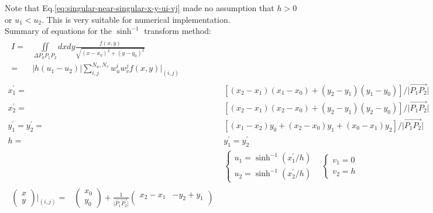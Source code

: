 \documentclass [10pt,letterpaper]{article}
\begin{document}
Note that Eq.\eqref{eq:singular-near-singular-x-y-ui-vj} made no assumption
that $h>0$ or $u_1<u_2$.
This is very suitable for numerical implementation.
\\
Summary of equations for the $\sinh^{-1}$ transform method:
\begin{subequations} \label{eq:singular-near-singular-summary-of-arsh-equations}
	\begin{align}
		\begin{split} 
			I
			=&
				\iint \limits_{\Delta P_0 P_1 P_2}
				dx dy
				\frac{ f(x,y) } { \sqrt{ (x-x_0)^2 + (y-y_0)^2 } }
			\\
			=&
				\lvert
					h
					(u_1-u_2)
				\rvert
				\sum \nolimits_{i,j}^{N_u,N_v} 
				w_u^i w_v^j
				f(x,y)
				\big\vert
				_{ (i,j) }
		\end{split}
		\\
		x_1^{\prime}	
		=&	
			[
				(x_2-x_1)(x_1-x_0)
				+ 
				(y_2-y_1)(y_1-y_0)
			]
			/{\lvert \overrightarrow{P_1 P_2} \rvert}
		\\ 
		x_2^{\prime}	
		=&	
			[
				(x_2-x_1)(x_2-x_0)
				+ 
				(y_2-y_1)(y_2-y_0)
			]
			/{\lvert \overrightarrow{P_1 P_2} \rvert}
		\\
		y_1^{\prime}
		=y_2^{\prime}
		=& 
			[
				(x_1-x_2)y_0
				+
				(x_2-x_0)y_1
				+
				(x_0-x_1)y_2 
			]
			/{\lvert \overrightarrow{P_1 P_2} \rvert}
		\\
		h
		=&
			y_1^{\prime}
		=
			y_2^{\prime}
		\\
		&
		\begin{cases} 
			u_1	=	\sinh^{-1}(x_1^{\prime}/h)		\\
			u_2	=	\sinh^{-1}(x_2^{\prime}/h)
		\end{cases}
		\ \ \ \ 
		\begin{cases} 
			v_1	=	0					\\
			v_2	=	h				
		\end{cases}
		\\ 
		\begin{split} 
			\begin{pmatrix} 
				x					\\
				y
			\end{pmatrix}
			\bigg\vert _{ (i,j) }
			=& 
			\begin{pmatrix}
				x_0					\\
				y_0
			\end{pmatrix}
			+
			\frac{1}{\lvert \overrightarrow{P_1 P_2} \rvert}
			\begin{pmatrix} 
				x_2-x_1 	& 	-y_2+y_1	\\

\end{pmatrix}
\end{split}
\end{align}
\end{subequations}
\end{document}

